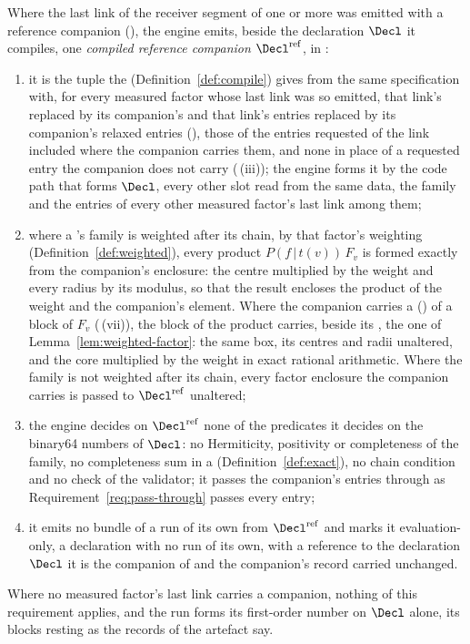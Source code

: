 \begin{requirement}\label{req:reference-companion-compiled}
Where the last link of the receiver segment of one or more
 was emitted with a reference
companion (), the engine emits,
beside the declaration $\Decl$ it compiles, one \emph{compiled reference
companion} $\Decl^{\mathrm{ref}}$, in :
\begin{enumerate}[label=(\roman*),leftmargin=2.4em]
\item it is the tuple the  (Definition~\ref{def:compile})
  gives from the same specification with, for every measured factor whose
  last link was so emitted, that link's  replaced by its
  companion's and that link's entries replaced by its companion's relaxed
  entries (), those of the entries
  requested of the link included where the companion carries them, and none
  in place of a requested entry the companion does not carry
  (\,(iii)); the engine forms it by
  the code path that forms $\Decl$, every other slot read from the same
  data, the family and the entries of every other measured factor's last
  link among them;
\item where a 's family is weighted after its chain,
  by that factor's weighting (Definition~\ref{def:weighted}), every product
  $P(f\,|\,t(v))\,F_v$ is
  formed exactly from the companion's enclosure: the centre multiplied by
  the weight and every radius by its modulus, so that the result encloses
  the product of the weight and the companion's element. Where the companion
  carries a  ()
  of a block of $F_v$ (\,(vii)),
  the block of the product carries, beside its , the one of
  Lemma~\ref{lem:weighted-factor}: the same box, its centres and radii
  unaltered, and the core multiplied by the weight in exact rational
  arithmetic. Where the family is not weighted after its chain, every factor
  enclosure the companion carries is passed to $\Decl^{\mathrm{ref}}$
  unaltered;
\item the engine decides on $\Decl^{\mathrm{ref}}$ none of the predicates
  it decides on the binary64 numbers of $\Decl$: no Hermiticity, positivity
  or completeness of the family, no completeness sum in a 
  (Definition~\ref{def:exact}), no chain condition and no check of the
  validator; it passes the companion's entries through as
  Requirement~\ref{req:pass-through} passes every entry;
\item it emits no bundle of a run of its own from $\Decl^{\mathrm{ref}}$
  and marks it evaluation-only, a declaration with no run of its own, with
  a reference to the declaration $\Decl$ it is the
  companion of and the companion's record carried unchanged.
\end{enumerate}
Where no measured factor's last link carries a companion, nothing of this
requirement applies, and the run forms its first-order number on $\Decl$
alone, its blocks resting as the records of the artefact say.
\end{requirement}
